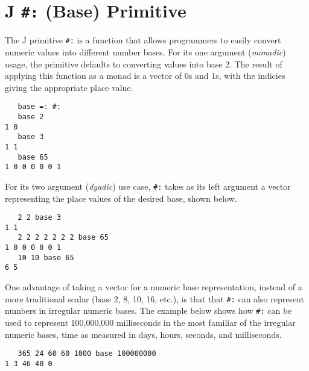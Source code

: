 \chapter{J \texttt{\#:} (Base) Primitive}
\label{base}
The J primitive \texttt{\#:} is a function that allows 
programmers to easily convert numeric values into different number bases. 
For its one argument (\textit{monadic}) usage, 
the primitive defaults to converting values into base 2. 
The result of applying this function as a monad 
is a vector of 0s and 1s, with the indicies giving the appropriate place value.

\begin{singlespacing}
\begin{small}
\begin{verbatim}
   base =: #:
   base 2
1 0
   base 3
1 1
   base 65
1 0 0 0 0 0 1
\end{verbatim}
\end{small}
\end{singlespacing}

For its two argument (\textit{dyadic}) use case, \texttt{\#:} takes as its left argument 
a vector representing the place values of the desired base, shown below. 

\begin{singlespacing}
\begin{small}
\begin{verbatim}
   2 2 base 3
1 1
   2 2 2 2 2 2 2 base 65
1 0 0 0 0 0 1
   10 10 base 65
6 5
\end{verbatim}
\end{small}
\end{singlespacing}

One advantage of taking a vector for a numeric base representation, instead of a more traditional scalar (base 2, 8, 10, 16, etc.), 
is that that \texttt{\#:} can also represent numbers in irregular numeric bases.
The example below shows how \texttt{\#:} can be used to represent 100,000,000 milliseconds in 
the most familiar of the irregular numeric bases, time as measured in days, hours, seconds, and milliseconds.

\begin{singlespacing}
\begin{small}
\begin{verbatim}
   365 24 60 60 1000 base 100000000
1 3 46 40 0\end{verbatim}
\end{small}
\end{singlespacing}


